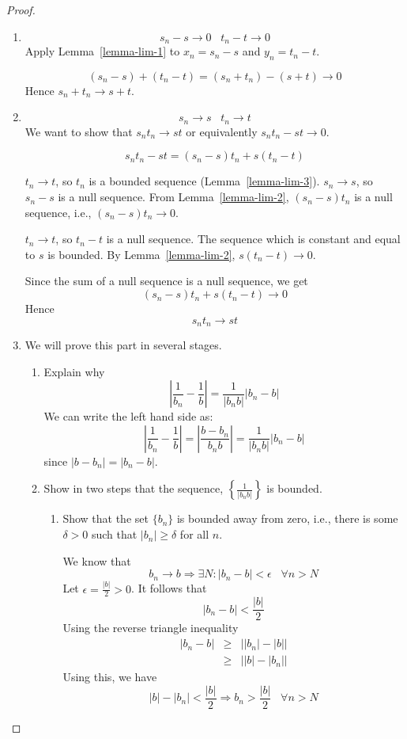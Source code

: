 \documentclass[12pt]{scrbook}
\begin{document}
\begin{proof}
\begin{enumerate}
\item
\[ s_n - s \rightarrow 0 \;\;\; t_n - t \rightarrow 0 \]
Apply Lemma~\ref{lemma-lim-1} to $x_n = s_n - s$ and $y_n = t_n - t$.

\[ (s_n - s) + (t_n - t) = (s_n + t_n) - (s + t) \rightarrow 0 \]
Hence $s_n + t_n \rightarrow s + t$.

\item 
\[ s_n \rightarrow s \;\;\; t_n \rightarrow t \]
We want to show that $s_n t_n \rightarrow s t$ or equivalently $s_n t_n - s t \rightarrow 0$.

\[ s_n t_n - s t = (s_n - s)t_n + s(t_n - t) \]

$t_n \rightarrow t$, so $t_n$ is a bounded sequence (Lemma~\ref{lemma-lim-3}).  $s_n \rightarrow s$, so $s_n - s$ is a null sequence.  From Lemma~\ref{lemma-lim-2}, $(s_n - s)t_n$ is a null sequence, i.e., $(s_n - s)t_n \rightarrow 0$.

$t_n \rightarrow t$, so $t_n - t$ is a null sequence. The sequence which is constant and equal to $s$ is bounded.  By Lemma~\ref{lemma-lim-2}, $s(t_n - t) \rightarrow 0$.

Since the sum of a null sequence is a null sequence, we get 
\[ (s_n - s)t_n + s(t_n - t) \rightarrow 0 \]
Hence
\[ s_n t_n \rightarrow s t \]

\item  We will prove this part in several stages.

\begin{enumerate}
\item Explain why 
\[\left| \frac{1}{b_n} - \frac{1}{b} \right| = \frac{1}{|b_n b|} \left| b_n - b \right| \]
We can write the left hand side as:
\[ \left| \frac{1}{b_n} - \frac{1}{b} \right| = \left| \frac{b - b_n}{b_n b} \right|  = \frac{1}{|b_n b|} \left| b_n - b \right| \]
since $|b - b_n| = |b_n - b|$.

\item Show in two steps that the sequence, $\left\{ \frac{1}{|b_n b|} \right\}$ is bounded.
\begin{enumerate}
\item Show that the set $\{ b_n \}$ is bounded away from zero, i.e., there is some $\delta > 0$ such that 
$|b_n| \ge \delta$ for all $n$.

We know that
\[ b_n \rightarrow b \Rightarrow \exists N: |b_n - b| < \epsilon \;\;\; \forall n > N \]
Let $\epsilon = \frac{|b|}{2} > 0$.  It follows that
\[ |b_n - b| < \frac{|b|}{2} \]
Using the reverse triangle inequality
\begin{eqnarray*}
|b_n - b| &\ge& \left| |b_n| - |b| \right| \\
              &\ge& \left| |b| - |b_n| \right| 
\end{eqnarray*}
Using this, we have
\[ |b| - |b_n| < \frac{|b|}{2} \Rightarrow b_n > \frac{|b|}{2} \;\;\; \forall n > N \] 


\end{enumerate}
\end{enumerate}
\end{enumerate}
\end{proof}
\end{document}
